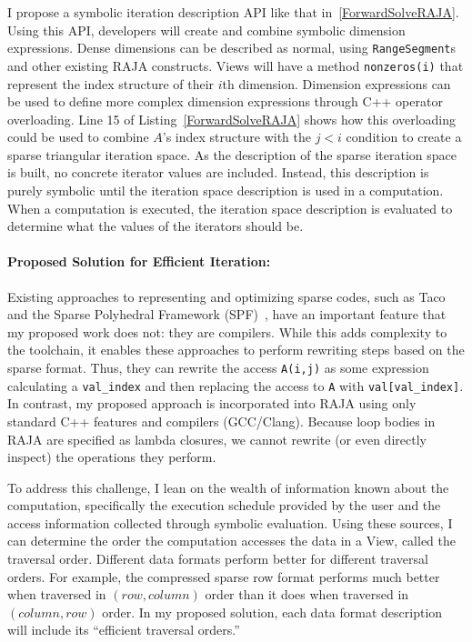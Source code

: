 \documentclass{article}
\begin{document}
I propose a symbolic iteration description API like that in~\autoref{ForwardSolveRAJA}.
Using this API, developers will create and combine symbolic dimension expressions.
Dense dimensions can be described as normal, using \verb.RangeSegment.s and other existing RAJA constructs.
Views will have a method \verb.nonzeros(i). that represent the index structure of their $i$th dimension.
Dimension expressions can be used to define more complex dimension expressions through C++ operator overloading.
Line 15 of Listing~\ref{ForwardSolveRAJA} shows how this overloading could be used to combine $A$'s index structure with the $j < i$ condition to create a sparse triangular iteration space.
As the description of the sparse iteration space is built, no concrete iterator values are included.
Instead, this description is purely symbolic until the iteration space description is used in a computation. 
When a computation is executed, the iteration space description is evaluated to determine what the values of the iterators should be.


\paragraph{Proposed Solution for Efficient Iteration:}
Existing approaches to representing and optimizing sparse codes, such as Taco and the Sparse Polyhedral Framework (SPF)~\cite{strout2016approach}, have an important feature that my proposed work does not: they are compilers.
While this adds complexity to the toolchain, it enables these approaches to perform rewriting steps based on the sparse format.
Thus, they can rewrite the access \verb.A(i,j). as some expression calculating a \verb.val_index. and then replacing the access to \verb.A. with \verb.val[val_index]..
In contrast, my proposed approach is incorporated into RAJA using only standard C++ features and compilers (GCC/Clang).
Because loop bodies in RAJA are specified as lambda closures, we cannot rewrite (or even directly inspect) the operations they perform.

To address this challenge, I lean on the wealth of information known about the computation, specifically the execution schedule provided by the user and the access information collected through symbolic evaluation. 
Using these sources, I can determine the order the computation accesses the data in a View, called the traversal order.
Different data formats perform better for different traversal orders.
For example, the compressed sparse row format performs much better when traversed in $(row,column)$ order than it does when traversed in $(column,row)$ order. 
In my proposed solution, each data format description will include its \enquote{efficient traversal orders.}
\end{document}
